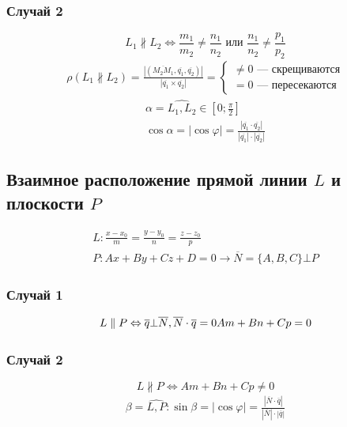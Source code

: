 \documentclass{article}
\begin{document}
\subsubsection{Случай 2}
\[
    L_1 \nparallel L_2 \Leftrightarrow \frac{m_1}{m_2} \neq \frac{n_1}{n_2} \text{ или } \frac{n_1}{n_2} \neq \frac{p_1}{p_2}
\]
\begin{gather*}
    \rho(L_1 \nparallel L_2) =
    \frac{\left| \left( \overline{M_2 M_1}, \overline{q_1}, \overline{q_2} \right) \right|}{\left| \overline{q_1} \times \overline{q_2} \right|} =
    \begin{cases}
        \neq 0 \text{ --- скрещиваются} \\
           = 0 \text{ --- пересекаются}
    \end{cases}
\end{gather*}
\begin{gather*}
    \alpha = \widehat{L_1, L_2} \in \left[ 0; \frac{\pi}{2} \right] \\
    \cos \alpha = \left| \cos \varphi \right| = 
    \frac{\left| \overline{q_1} \cdot \overline{q_2} \right|}{\left| \overline{q_1} \right| \cdot \left| \overline{q_2} \right|}
\end{gather*}


\subsection{Взаимное расположение прямой линии $L$ и плоскости $P$}
\begin{gather*}
    L: \frac{x - x_0}{m} = \frac{y - y_0}{n} = \frac{z - z_0}{p} \\
    P: Ax + By + Cz + D = 0 \rightarrow \overline{N} = \{A, B, C\} \bot P
\end{gather*}

\subsubsection{Случай 1}
\[
    L \parallel P \Leftrightarrow \overline{q} \bot \overline{N}, 
    \overline{N} \cdot \overline{q} = 0 \\
    Am + Bn + Cp = 0
\]

\subsubsection{Случай 2}
\[
    L \nparallel P \Leftrightarrow Am + Bn + Cp \neq 0
\]
\begin{gather*}
    \beta = \widehat{L, P}: 
    \sin \beta = \left| \cos \varphi \right| = 
    \frac{\left| \overline{N} \cdot \overline{q} \right|}{\left| \overline{N} \right| \cdot \left| \overline{q} \right|}
\end{gather*}
\end{document}
